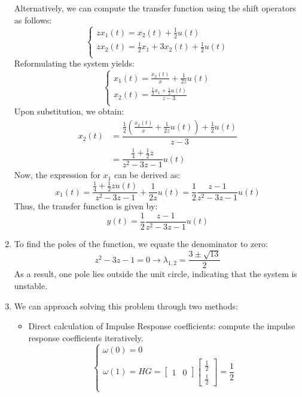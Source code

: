 \begin{enumerate}
        Alternatively, we can compute the transfer function using the shift operators as follows:
        \[\begin{cases}
            zx_1(t)=x_2(t)+\frac{1}{2}u(t) \\
            zx_2(t)=\frac{1}{2}x_1+3x_2(t)+\frac{1}{2}u(t) \\
        \end{cases}\]
        Reformulating the system yields:
        \[\begin{cases}
            x_1(t)=\frac{x_2(t)}{x}+\frac{1}{2z}u(t) \\
            x_2(t)=\frac{\frac{1}{2}x_1+\frac{1}{2}u(t)}{z-3} \\
        \end{cases}\]
        Upon substitution, we obtain:
        \begin{align*}
            x_2(t)  &=\dfrac{\frac{1}{2}\left(\frac{x_2(t)}{x}+\frac{1}{2z}u(t)\right)+\frac{1}{2}u(t)}{z-3} \\
                    &=\dfrac{\frac{1}{4}+\frac{1}{2}z}{z^2-3z-1}u(t)
        \end{align*}
        Now, the expression for $x_1$ can be derived as:
        \[x_1(t)=\dfrac{\frac{1}{4}+\frac{1}{2}zu(t)}{z^2-3z-1}+\dfrac{1}{2z}u(t)=\dfrac{1}{2}\dfrac{z-1}{z^2-3z-1}u(t)\]
        Thus, the transfer function is given by:
        \[y(t)=\dfrac{1}{2}\dfrac{z-1}{z^2-3z-1}u(t)\]
    \item To find the poles of the function, we equate the denominator to zero:
        \[z^{2}-3z-1=0\rightarrow\lambda_{1,2}=\dfrac{3\pm\sqrt{13}}{2}\]
        As a result, one pole lies outside the unit circle, indicating that the system is unstable.
    \item We can approach solving this problem through two methods:
        \begin{itemize}
            \item Direct calculation of Impulse Response coefficients: compute the impulse response coefficients iteratively.
                \[\begin{cases}
                    \omega(0)=0 \\
                    \omega(1)=HG=\begin{bmatrix} 1 & 0 \end{bmatrix}\begin{bmatrix} \frac{1}{2} \\ \frac{1}{2} \end{bmatrix}=\dfrac{1}{2} \\

\end{cases}\]
\end{itemize}
\end{enumerate}
